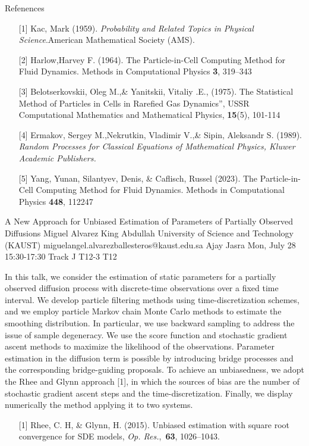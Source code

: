 \begin{talk}
Refenences
\begin{enumerate}
	\item[{[1]}] Kac, Mark (1959). {\it Probability and Related Topics in Physical Science}.American Mathematical Society (AMS).
	\item[{[2]}] Harlow,Harvey F.  (1964).   The Particle-in-Cell Computing Method for Fluid Dynamics. Methods in Computational Physics \textbf{3}, 319--343
\item[{[3]}] Belotserkovskii, Oleg M.,\& Yanitskii, Vitaliy .E.,   (1975).  The Statistical Method of Particles in Cells in Rarefied Gas Dynamics”, USSR Computational Mathematics and Mathematical Physics,  \textbf{15}(5), 101-114
\item[{[4]}] Ermakov, Sergey M.,Nekrutkin, Vladimir V.,\& Sipin, Aleksandr S.  (1989). {\it Random Processes for Classical Equations of Mathematical Physics, Kluwer Academic Publishers.}
\item[{[5]} ] Yang, Yunan, Silantyev, Denis, \&   Caflisch, Russel (2023).   The Particle-in-Cell Computing Method for Fluid Dynamics. Methods in Computational Physics \textbf{448}, 112247
\end{enumerate}

\end{talk}
\begin{talk}
  {A New Approach for Unbiased Estimation of Parameters of Partially Observed Diffusions}%
  {Miguel Alvarez}%
  {King Abdullah University of Science and Technology (KAUST)}%
  {miguelangel.alvarezballesteros@kaust.edu.sa}%
  {Ajay Jasra}%
  {}%
  {Mon, July 28 15:30-17:30 Track J}%
  {T12-3}%
  {T12}%
			
In this talk, we consider the estimation of static parameters for a partially observed diffusion process with discrete-time observations over a fixed time interval. We develop particle filtering methods using time-discretization schemes, and we employ particle Markov chain Monte Carlo methods to estimate the smoothing distribution. In particular, we use backward sampling to address the issue of sample degeneracy. We use the score function and stochastic gradient ascent methods to maximize the likelihood of the observations. Parameter estimation in the diffusion term is possible by introducing bridge processes and the corresponding bridge-guiding proposals. To achieve an unbiasedness, we adopt the Rhee and Glynn approach [1], in which the sources of bias are the number of stochastic gradient ascent steps and the time-discretization. Finally, we display numerically the method applying it to two systems. 

\medskip

\begin{enumerate}
	\item[{[1]}] Rhee, C. H, \& Glynn, H. (2015).  Unbiased estimation with square root convergence for SDE models, \emph{Op. Res.},~{\bf 63}, 1026--1043. 
\end{enumerate}

\end{talk}
